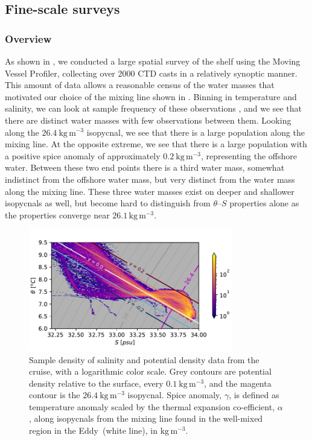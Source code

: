 \documentclass[draft]{agujournal2019}
\newcommand*{\Eddy}{{\sc Eddy}}
\begin{document}
\subsection{Fine-scale surveys}

\subsubsection{Overview}

As shown in ,  we conducted a large spatial survey of the shelf using the Moving Vessel Profiler, collecting over 2000 CTD casts in a relatively synoptic manner.  This amount of data allows a reasonable census of the water masses that motivated our choice of the mixing line shown in .  Binning in temperature and salinity, we can look at sample frequency of these observations , and we see that there are distinct water masses with few observations between them. Looking along the $26.4\ \mathrm{kg\,m^{-3}}$ isopycnal, we see that there is a large population along the mixing line.  At the opposite extreme, we see that there is a large population with a positive spice anomaly of approximately $0.2\ \mathrm{kg\,m^{-3}}$, representing the offshore water.  Between these two end points there is a third water mass, somewhat indistinct from the offshore water mass, but very distinct from the water mass along the mixing line.  These three water masses exist on deeper and shallower isopycnals as well, but become hard to distinguish from $\theta$--$S$ properties alone as the properties converge near $26.1\,\mathrm{kg\,m^{-3}}$.


\begin{figure}[htbp]
  \begin{center}
     \includegraphics[width=3.5in]{TSdensSpice.pdf}
    \caption{Sample density of salinity and potential density data from the cruise, with a logarithmic color scale.  Grey contours are potential density relative to the surface, every $0.1\ \mathrm{kg\,m^{-3}}$, and the magenta contour is the $26.4\ \mathrm{kg\,m^{-3}}$ isopycnal.  Spice anomaly, $\gamma$, is defined as temperature anomaly scaled by the thermal expansion co-efficient, $\alpha$, along isopycnals from the mixing line found in the well-mixed region in the \Eddy\ (white line), in $\mathrm{kg\,m^{-3}}$.
    \label{fig:TSdensSpice}}
  \end{center}
\end{figure}
\end{document}
